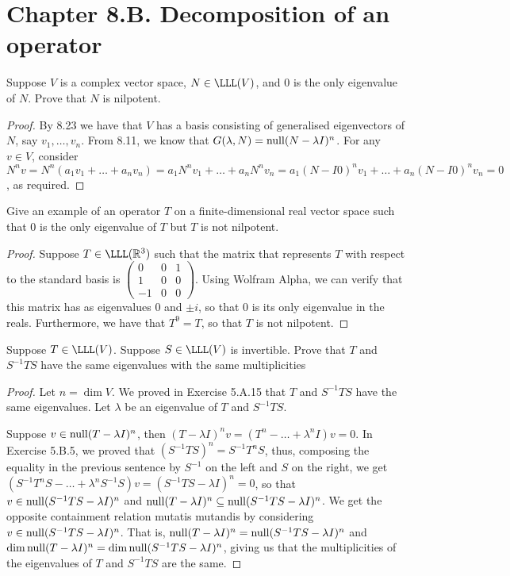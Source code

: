 \section*{Chapter 8.B. Decomposition of an operator}


\begin{exercise}{1}
  Suppose $V$ is a complex vector space, $N\in\LLL(V)$, and 0 is the only eigenvalue of $N$. Prove that $N$ is nilpotent.
\end{exercise}
\begin{proof}
 By 8.23 we have that $V$ has a basis consisting of generalised eigenvectors of $N$, say $v_1,\dots,v_n$. From 8.11, we know that $G(\lambda, N)=\operatorname*{null}(N-\lambda I)^n$. For any $v\in V$, consider $N^nv =N^n(a_1v_1+\dots+a_nv_n) =a_1N^nv_1+\dots+a_nN^nv_n=a_1(N-I0)^nv_1+\dots+a_n(N-I0)^nv_n =0$, as required.
\end{proof}

\begin{exercise}{2}
  Give an example of an operator $T$ on a finite-dimensional real vector space such that 0 is the only eigenvalue of $T$ but $T$ is not nilpotent.
\end{exercise}
\begin{proof}
 Suppose $T\in\LLL(\R^3)$ such that the matrix that represents $T$ with respect to the standard basis is
 $\begin{pmatrix}
 0 & 0 &1\\
 1 & 0 & 0\\
 -1 & 0 &0
 \end{pmatrix}$.
 Using Wolfram Alpha, we can verify that this matrix has as eigenvalues 0 and $\pm i$, so that 0 is its only eigenvalue in the reals. Furthermore, we have that $T^9=T$, so that $T$ is not nilpotent.
\end{proof}

\begin{exercise}{3}
  Suppose $T\in\LLL(V)$. Suppose $S\in\LLL(V)$ is invertible. Prove that $T$ and $S^{-1}TS$ have the same eigenvalues with the same multiplicities
\end{exercise}
\begin{proof}
 Let $n=\dim V$. We proved in Exercise 5.A.15 that $T$ and $S^{-1}TS$ have the same eigenvalues. Let $\lambda$ be an eigenvalue of $T$ and $S^{-1}TS$. 

 Suppose $v\in\operatorname*{null}(T-\lambda I)^n$, then $(T-\lambda I)^nv =(T^n-\dots +\lambda^n I)v =0$. In Exercise 5.B.5, we proved that $(S^{-1}TS)^n =S^{-1}T^nS$, thus, composing the equality in the previous sentence by $S^{-1}$ on the left and $S$ on the right, we get $(S^{-1}T^nS-\dots +\lambda^n S^{-1}S)v =(S^{-1}TS-\lambda I)^n =0$, so that $v\in\operatorname*{null}(S^{-1}TS-\lambda I)^n$ and $\operatorname*{null}(T-\lambda I)^n\subseteq \operatorname*{null}(S^{-1}TS-\lambda I)^n$. We get the opposite containment relation mutatis mutandis by considering $v\in\operatorname*{null}(S^{-1}TS-\lambda I)^n$. That is, $\operatorname*{null}(T-\lambda I)^n =\operatorname*{null}(S^{-1}TS-\lambda I)^n$ and $\dim\operatorname*{null}(T-\lambda I)^n =\dim\operatorname*{null}(S^{-1}TS-\lambda I)^n$, giving us that the multiplicities of the eigenvalues of $T$ and $S^{-1}TS$ are the same.
 \end{proof}

